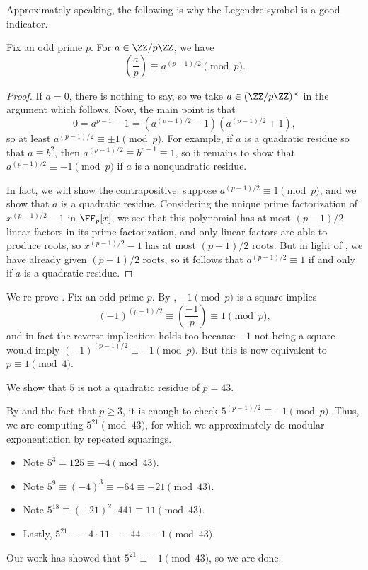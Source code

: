 \documentclass[../notes.tex]{subfiles}
\begin{document}
Approximately speaking, the following is why the Legendre symbol is a good indicator.
\begin{proposition} \label{prop:euler-criterion}
	Fix an odd prime $p$. For $a\in\ZZ/p\ZZ$, we have
	\[\left(\frac ap\right)\equiv a^{(p-1)/2}\pmod p.\]
\end{proposition}
\begin{proof}
	If $a=0$, there is nothing to say, so we take $a\in(\ZZ/p\ZZ)^\times$ in the argument which follows. Now, the main point is that
	\[0=a^{p-1}-1=\left(a^{(p-1)/2}-1\right)\left(a^{(p-1)/2}+1\right),\]
	so at least $a^{(p-1)/2}\equiv\pm1\pmod p$. For example, if $a$ is a quadratic residue so that $a\equiv b^2$, then $a^{(p-1)/2}\equiv b^{p-1}\equiv1$, so it remains to show that $a^{(p-1)/2}\equiv-1\pmod p$ if $a$ is a nonquadratic residue.

	In fact, we will show the contrapositive: suppose $a^{(p-1)/2}\equiv1\pmod p$, and we show that $a$ is a quadratic residue. Considering the unique prime factorization of $x^{(p-1)/2}-1$ in $\FF_p[x]$, we see that this polynomial has at most $(p-1)/2$ linear factors in its prime factorization, and only linear factors are able to produce roots, so $x^{(p-1)/2}-1$ has at most $(p-1)/2$ roots. But in light of , we have already given $(p-1)/2$ roots, so it follows that $a^{(p-1)/2}\equiv1$ if and only if $a$ is a quadratic residue.
\end{proof}
\begin{example} \label{ex:leg-minus-one}
	We re-prove . Fix an odd prime $p$. By , $-1\pmod p$ is a square implies
	\[(-1)^{(p-1)/2}\equiv\left(\frac{-1}p\right)\equiv1\pmod p,\]
	and in fact the reverse implication holds too because $-1$ not being a square would imply $(-1)^{(p-1)/2}\equiv-1\pmod p$. But this is now equivalent to $p\equiv1\pmod4$.
\end{example}
\begin{example}
	We show that $5$ is not a quadratic residue of $p=43$.
\end{example}
\begin{solution}
	By  and the fact that $p\ge3$, it is enough to check $5^{(p-1)/2}\equiv-1\pmod p$. Thus, we are computing $5^{21}\pmod{43}$, for which we approximately do modular exponentiation by repeated squarings.
	\begin{itemize}
		\item Note $5^3=125\equiv-4\pmod{43}$.
		\item Note $5^9\equiv(-4)^3\equiv-64\equiv-21\pmod{43}$.
		\item Note $5^{18}\equiv(-21)^2\cdot441\equiv11\pmod{43}$.
		\item Lastly, $5^{21}\equiv-4\cdot11\equiv-44\equiv-1\pmod{43}$.
	\end{itemize}
	Our work has showed that $5^{21}\equiv-1\pmod{43}$, so we are done.
\end{solution}
\end{document}
